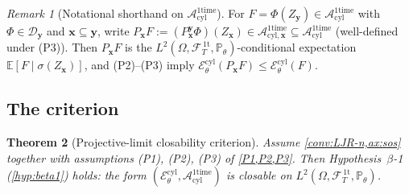 \documentclass[11pt,reqno]{amsart}
\theoremstyle{plain}
\newtheorem{theorem}{Theorem}[section]
\theoremstyle{definition}
\theoremstyle{remark}
\newtheorem{remark}[theorem]{Remark}
\newcommand{\E}{\mathbb E}
\newcommand{\Prob}{\mathbb P}
\newcommand{\cA}{\mathcal A}
\newcommand{\cE}{\mathcal E}
\newcommand{\cF}{\mathcal F}
\newcommand{\Aone}{\cA_{\mathrm{cyl}}^{\mathrm{1time}}}
\newcommand{\Aoneat}[1]{\cA^{\mathrm{1time}}_{\mathrm{cyl},#1}}
\newcommand{\FT}{\cF_{T}^{\,\mathrm{1t}}}
\newcommand{\Hone}{L^{2}(\Omega,\FT,\Pth)}
\newcommand{\Ecyl}{\cE_{\theta}^{\mathrm{cyl}}}
\newcommand{\Pth}{\Prob_{\theta}}
\begin{document}
\begin{remark}[Notational shorthand on $\Aone$]\label{rem:P-shorthand}
For $F=\Phi(Z_{\mathbf y})\in\Aone$ with
$\Phi\in\mathcal D_{\mathbf y}$ and $\mathbf x\subseteq\mathbf y$,
write $P_{\mathbf x}F:=(P_{\mathbf x}^{\mathbf y}\Phi)(Z_{\mathbf x})\in\Aoneat{\mathbf x}\subseteq\Aone$
(well-defined under (P3)). Then $P_{\mathbf x}F$ is the
$\Hone$-conditional expectation $\E[F\mid\sigma(Z_{\mathbf x})]$,
and (P2)--(P3) imply $\Ecyl(P_{\mathbf x}F)\le\Ecyl(F)$.
\end{remark}

\subsection{The criterion}\label{sec:formclos-theorem}

\begin{theorem}[Projective-limit closability criterion]\label{thm:proj-lim-closability}
Assume \cref{conv:LJR-n,ax:sos} together with assumptions (P1),
(P2), (P3) of \cref{P1,P2,P3}. Then Hypothesis~$\beta$-1
(\cref{hyp:beta1}) holds: the form $(\Ecyl,\Aone)$ is closable on
$\Hone$.
\end{theorem}
\end{document}
